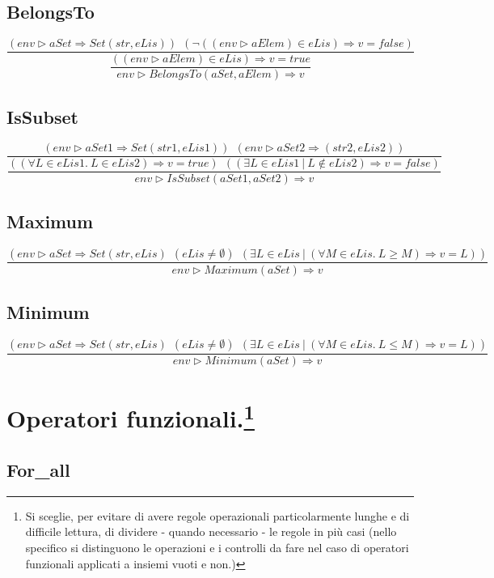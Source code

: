 \documentclass[10pt, italian, openany]{book}
\begin{document}
\section{BelongsTo}
\[
\dfrac
	{(env \rhd aSet \Longrightarrow Set(str, eLis)) \ \ (\neg ((env \rhd aElem) \in eLis) \Longrightarrow v = false)}
	{
		\dfrac
		{((env \rhd aElem) \in eLis) \Longrightarrow v = true}
		{env \rhd BelongsTo(aSet, aElem) \Longrightarrow v}
	}
\]

\section{IsSubset}
\[
\dfrac
	{(env \rhd aSet1 \Longrightarrow Set(str1, eLis1)) \ \ (env \rhd aSet2 \Longrightarrow (str2, eLis2))}
	{\dfrac
		{ ((\forall L \in eLis1. \ L \in eLis2) \Longrightarrow v = true) \ \ ((\exists L \in eLis1 \ | \ L \notin  eLis2) \Longrightarrow v = false) }
		{env \rhd IsSubset(aSet1, aSet2) \Longrightarrow v}
	}
\]

\section{Maximum}
\[
\dfrac
	{(env \rhd aSet \Longrightarrow Set(str, eLis) \ \ (eLis \neq \emptyset) \ \ (\exists L \in eLis \ | \ (\forall M \in eLis. \ L \geq M ) \Longrightarrow v = L)  )}
	{env \rhd Maximum(aSet) \Longrightarrow v}
\]

\section{Minimum}
\[
\dfrac
	{(env \rhd aSet \Longrightarrow Set(str, eLis) \ \ (eLis \neq \emptyset) \ \ (\exists L \in eLis \ | \ (\forall M \in eLis. \ L \leq M ) \Longrightarrow v = L)  )}
	{env \rhd Minimum(aSet) \Longrightarrow v}
\]

{\let\clearpage\relax \chapter*{Operatori funzionali.\footnote{Si sceglie, per evitare di avere regole operazionali particolarmente lunghe e di difficile lettura, di dividere - quando necessario - le regole in pi\`u casi (nello specifico si distinguono le operazioni e i controlli da fare nel caso di operatori funzionali applicati a insiemi vuoti e non.)}}}
\section*{For\_all}
\end{document}

